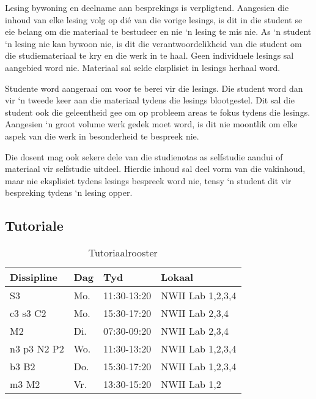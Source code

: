         Lesing bywoning en deelname aan besprekings is verpligtend.  Aangesien
        die inhoud van elke lesing volg op di\'{e} van die vorige lesings, is
        dit in die student se eie belang om die materiaal te bestudeer en nie
        `n lesing te mis nie. As `n student `n lesing nie kan bywoon nie, is
        dit die verantwoordelikheid van die student om die studiemateriaal te
        kry en die werk in te haal.  Geen individuele lesings sal aangebied
        word nie. Materiaal sal selde eksplisiet in lesings herhaal word.

        Studente word aangeraai om voor te berei vir die lesings. Die
        student word dan vir `n tweede keer aan die materiaal tydens
        die lesings blootgestel. Dit sal die student ook die
        geleentheid gee om op probleem areas te fokus tydens die
        lesings. Aangesien `n groot volume werk gedek moet word, is
        dit nie moontlik om elke aspek van die werk in besonderheid te
        bespreek nie.

        Die dosent mag ook sekere dele van die studienotas as selfstudie aandui
        of materiaal vir selfstudie uitdeel. Hierdie inhoud sal deel vorm van
        die vakinhoud, maar nie eksplisiet tydens lesings bespreek word nie,
        tensy `n student dit vir bespreking tydens `n lesing opper.

    \subsection{Tutoriale}
        \begin{table}[!h]
            \begin{center}
            \begin{tabular}{|l|l|l|l|}
                \hline
                {\bf Dissipline} & {\bf Dag} & {\bf Tyd} & {\bf Lokaal} \\
                \hline
                S3          & Mo.  & 11:30-13:20 & NWII Lab 1,2,3,4 \\
                c3 s3 C2    & Mo.  & 15:30-17:20 & NWII Lab 2,3,4 \\
                M2          & Di.  & 07:30-09:20 & NWII Lab 2,3,4 \\
                n3 p3 N2 P2 & Wo.  & 11:30-13:20 & NWII Lab 1,2,3,4 \\
                b3 B2       & Do.  & 15:30-17:20 & NWII Lab 1,2,3,4 \\
                m3 M2       & Vr.  & 13:30-15:20 & NWII Lab 1,2 \\
                \hline
            \end{tabular}
            \caption{Tutoriaalrooster}
            \label{tab:tutorials}
            \end{center}
        \end{table}

